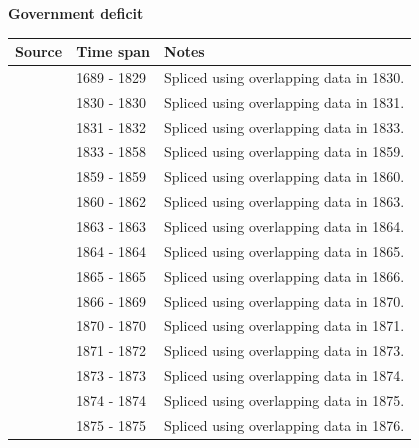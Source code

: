 \documentclass[12pt,a4paper,landscape]{article}
\begin{document}
\begin{adjustbox}{max totalsize={\paperwidth}{\paperheight},center}
\begin{minipage}[t][\textheight][t]{\textwidth}
\vspace*{0.5cm}
{}
\begin{center}
{\Large\bfseries Government deficit}
\end{center}
\vspace{0.5cm}
\begin{table}[H]
\centering
\small
\begin{tabular}{|l|l|l|}
\hline
\textbf{Source} & \textbf{Time span} & \textbf{Notes} \\
\hline
\rowcolor{white}\cite{CS1_GBR}& 1689 - 1829 &Spliced using overlapping data in 1830. \\
\rowcolor{lightgray}\cite{IMF_FPP}& 1830 - 1830 &Spliced using overlapping data in 1831. \\
\rowcolor{white}\cite{CS1_GBR}& 1831 - 1832 &Spliced using overlapping data in 1833. \\
\rowcolor{lightgray}\cite{IMF_FPP}& 1833 - 1858 &Spliced using overlapping data in 1859. \\
\rowcolor{white}\cite{CS1_GBR}& 1859 - 1859 &Spliced using overlapping data in 1860. \\
\rowcolor{lightgray}\cite{IMF_FPP}& 1860 - 1862 &Spliced using overlapping data in 1863. \\
\rowcolor{white}\cite{CS1_GBR}& 1863 - 1863 &Spliced using overlapping data in 1864. \\
\rowcolor{lightgray}\cite{IMF_FPP}& 1864 - 1864 &Spliced using overlapping data in 1865. \\
\rowcolor{white}\cite{CS1_GBR}& 1865 - 1865 &Spliced using overlapping data in 1866. \\
\rowcolor{lightgray}\cite{IMF_FPP}& 1866 - 1869 &Spliced using overlapping data in 1870. \\
\rowcolor{white}\cite{CS1_GBR}& 1870 - 1870 &Spliced using overlapping data in 1871. \\
\rowcolor{lightgray}\cite{IMF_FPP}& 1871 - 1872 &Spliced using overlapping data in 1873. \\
\rowcolor{white}\cite{CS1_GBR}& 1873 - 1873 &Spliced using overlapping data in 1874. \\
\rowcolor{lightgray}\cite{IMF_FPP}& 1874 - 1874 &Spliced using overlapping data in 1875. \\
\rowcolor{white}\cite{CS1_GBR}& 1875 - 1875 &Spliced using overlapping data in 1876. \\

\end{tabular}
\end{table}
\end{minipage}
\end{adjustbox}
\end{document}
